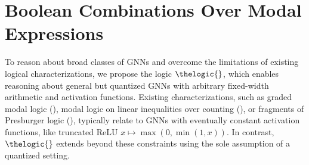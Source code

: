 \section{Boolean Combinations Over Modal Expressions}
\label{sec:logic}

To reason about broad classes of GNNs and overcome the limitations of existing logical characterizations, we propose the logic $\thelogic{}$, which enables reasoning about general but quantized GNNs with arbitrary fixed-width arithmetic and activation functions. Existing characterizations, such as graded modal logic (\cite{DBLP:conf/iclr/BarceloKM0RS20}), modal logic on linear inequalities over counting (\cite{ijcai2024}), or fragments of Presburger logic (\cite{benedikt2024decidability}), typically relate to GNNs with eventually constant activation functions, like truncated ReLU $x \mapsto \max(0, \min(1,x))$. In contrast, $\thelogic{}$ extends beyond these constraints using the sole assumption of a quantized setting.

